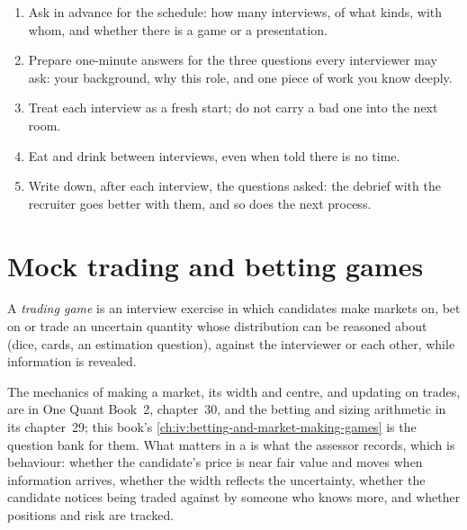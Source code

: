\begin{method}\label{met:iv:the-final-round-and-trading-games:day}
\begin{enumerate}
\item Ask in advance for the schedule: how many interviews, of what kinds, with whom, and whether there is a
game or a presentation.
\item Prepare one-minute answers for the three questions every interviewer may ask: your background, why this
role, and one piece of work you know deeply.
\item Treat each interview as a fresh start; do not carry a bad one into the next room.
\item Eat and drink between interviews, even when told there is no time.
\item Write down, after each interview, the questions asked: the debrief with the recruiter goes better with
them, and so does the next process.
\end{enumerate}
\end{method}

\section{Mock trading and betting games}

\begin{definition}\label{def:iv:the-final-round-and-trading-games:game}
A \emph{trading game} is an interview exercise in which candidates make markets on, bet
on or trade an uncertain quantity whose distribution can be reasoned about (dice, cards, an estimation
question), against the interviewer or each other, while information is revealed.
\end{definition}

The mechanics of making a market, its width and centre, and updating on trades, are in One Quant Book~2,
chapter~30, and the betting and sizing arithmetic in its chapter~29; this book's
\cref{ch:iv:betting-and-market-making-games} is the question bank for them. What matters in a  is
what the assessor records, which is behaviour: whether the candidate's price is near fair value and moves when
information arrives, whether the width reflects the uncertainty, whether the candidate notices being traded
against by someone who knows more, and whether positions and risk are tracked.

